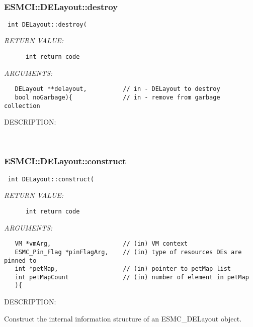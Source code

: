    
 
\mbox{}\hrulefill\
 
\subsubsection [ESMCI::DELayout::destroy] {ESMCI::DELayout::destroy}


  
\begin{verbatim} int DELayout::destroy(\end{verbatim}{\em RETURN VALUE:}
\begin{verbatim}      int return code\end{verbatim}{\em ARGUMENTS:}
\begin{verbatim}   DELayout **delayout,          // in - DELayout to destroy
   bool noGarbage){              // in - remove from garbage collection\end{verbatim}
{\sf DESCRIPTION:\\ }


   
 
\mbox{}\hrulefill\
 
\subsubsection [ESMCI::DELayout::construct] {ESMCI::DELayout::construct}


  
\begin{verbatim} int DELayout::construct(\end{verbatim}{\em RETURN VALUE:}
\begin{verbatim}      int return code\end{verbatim}{\em ARGUMENTS:}
\begin{verbatim}   VM *vmArg,                    // (in) VM context
   ESMC_Pin_Flag *pinFlagArg,    // (in) type of resources DEs are pinned to
   int *petMap,                  // (in) pointer to petMap list
   int petMapCount               // (in) number of element in petMap
   ){\end{verbatim}
{\sf DESCRIPTION:\\ }


      Construct the internal information structure of an ESMC\_DELayout object.
   
